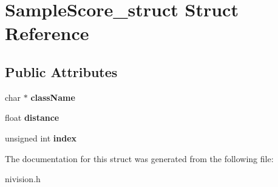 \hypertarget{structSampleScore__struct}{
\section{SampleScore\_\-struct Struct Reference}
\label{structSampleScore__struct}
}
\subsection*{Public Attributes}
\begin{DoxyCompactItemize}
\item 
\hypertarget{structSampleScore__struct_a69c2914458f46ff501c87038b39daed1}{
char $\ast$ {\bfseries className}}
\label{structSampleScore__struct_a69c2914458f46ff501c87038b39daed1}

\item 
\hypertarget{structSampleScore__struct_a921ae023a218519d26730c3d081b6066}{
float {\bfseries distance}}
\label{structSampleScore__struct_a921ae023a218519d26730c3d081b6066}

\item 
\hypertarget{structSampleScore__struct_a47d2e5fb45c9d13cfe93cab9f379873c}{
unsigned int {\bfseries index}}
\label{structSampleScore__struct_a47d2e5fb45c9d13cfe93cab9f379873c}

\end{DoxyCompactItemize}


The documentation for this struct was generated from the following file:\begin{DoxyCompactItemize}
\item 
nivision.h\end{DoxyCompactItemize}
